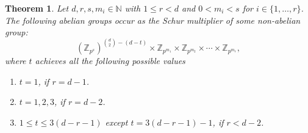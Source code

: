 \documentclass[preprint,sort&compress,12pt]{elsarticle}
\newtheorem{theorem}{Theorem}[section]
\numberwithin{equation}{section}
\theoremstyle{definition}
\newcommand{\Z}{\mathbb{Z}}
\begin{document}
\begin{theorem} \label{bound M(G_{j,k})}
 Let $d, r, s , m_i \in \mathbb{N}$ with $1 \leq r < d$ and
$0 < m_i < s$ for $i \in \{1, \ldots,r\}$.
The following abelian groups occur as the Schur multiplier of some non-abelian group:
 $$ (\Z_{p^s})^{\binom{d}{2}-(d-t)} \times  \Z_{p^{m_1}} \times \Z_{p^{m_2}} \times \cdots \times \Z_{p^{m_r}},$$
 where $t$ achieves all the following possible values
\begin{enumerate}
\item [(i)] $t=1$, if $r=d-1$.
    \item [(ii)]  $ t=1,2,3$, if $r=d-2$.
 \item [(iii)]  $1  \le t \le 3(d-r-1)$ except ${t=3(d-r-1)-1}$, if $r< d-2$.
\end{enumerate}
\end{theorem}
\end{document}
